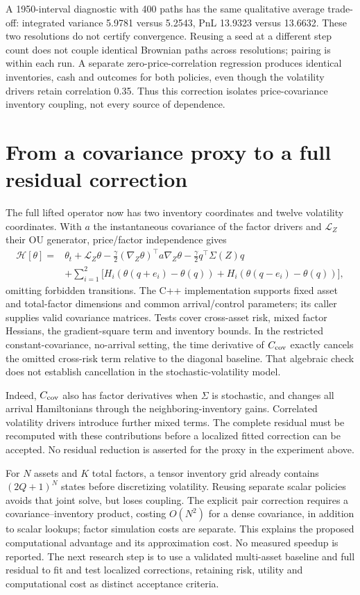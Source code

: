 A 1950-interval diagnostic with 400 paths has the same qualitative average trade-off: integrated variance 5.9781 versus 5.2543, PnL 13.9323 versus 13.6632. These two resolutions do not certify convergence. Reusing a seed at a different step count does not couple identical Brownian paths across resolutions; pairing is within each run. A separate zero-price-correlation regression produces identical inventories, cash and outcomes for both policies, even though the volatility drivers retain correlation 0.35. Thus this correction isolates price-covariance inventory coupling, not every source of dependence.

\section{From a covariance proxy to a full residual correction}
The full lifted operator now has two inventory coordinates and twelve volatility coordinates. With $a$ the instantaneous covariance of the factor drivers and $\mathcal L_Z$ their OU generator, price/factor independence gives
\begin{align*}
\mathcal H[\theta]={}&\theta_t+\mathcal L_Z\theta
-\frac{\gamma}{2}(\nabla_Z\theta)^\top a\nabla_Z\theta
-\frac{\gamma}{2}q^\top\Sigma(Z)q\\
&+\sum_{i=1}^{2}\bigl[H_i(\theta(q+e_i)-\theta(q))
+H_i(\theta(q-e_i)-\theta(q))\bigr],
\end{align*}
omitting forbidden transitions. The C++ implementation supports fixed asset and total-factor dimensions and common arrival/control parameters; its caller supplies valid covariance matrices. Tests cover cross-asset risk, mixed factor Hessians, the gradient-square term and inventory bounds. In the restricted constant-covariance, no-arrival setting, the time derivative of $C_{\rm cov}$ exactly cancels the omitted cross-risk term relative to the diagonal baseline. That algebraic check does not establish cancellation in the stochastic-volatility model.

Indeed, $C_{\rm cov}$ also has factor derivatives when $\Sigma$ is stochastic, and changes all arrival Hamiltonians through the neighboring-inventory gains. Correlated volatility drivers introduce further mixed terms. The complete residual must be recomputed with these contributions before a localized fitted correction can be accepted. No residual reduction is asserted for the proxy in the experiment above.

For $N$ assets and $K$ total factors, a tensor inventory grid already contains $(2Q+1)^N$ states before discretizing volatility. Reusing separate scalar policies avoids that joint solve, but loses coupling. The explicit pair correction requires a covariance--inventory product, costing $O(N^2)$ for a dense covariance, in addition to scalar lookups; factor simulation costs are separate. This explains the proposed computational advantage and its approximation cost. No measured speedup is reported. The next research step is to use a validated multi-asset baseline and full residual to fit and test localized corrections, retaining risk, utility and computational cost as distinct acceptance criteria.
\clearpage
